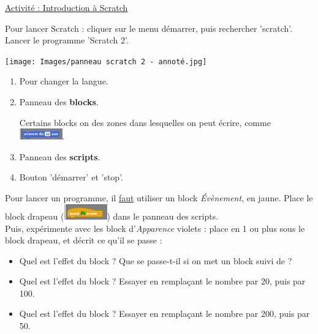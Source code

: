 \documentclass[a4paper,11pt]{article}
\newcommand{\exerciceSpacing}{2em}
\begin{document}
\begin{center}
	\LARGE
	\uline{Activité : Introduction à Scratch}
\end{center}

\begin{greybox}[frametitle={Pour commencer}]
	Pour lancer Scratch : cliquer sur le menu démarrer, puis rechercher 'scratch'. Lancer le programme 'Scratch 2'. \vspace{1em}

	\texttt{[image: Images/panneau scratch 2 - annoté.jpg]}

	\begin{enumerate}
		\item Pour changer la langue.
		\item Panneau des \textbf{blocks}.

		      Certains blocks on des zones dans lesquelles on peut écrire, comme \includegraphics[width=5em]{Images/Block avancer de 10 pas.png}.
		\item Panneau des \textbf{scripts}.
		\item Bouton 'démarrer' et 'stop'.
	\end{enumerate}
\end{greybox}

\vspace{\exerciceSpacing}

\begin{exercice}
	Pour lancer un programme, il \uline{faut} utiliser un block \textit{Évènement}, en jaune. Place le block drapeau (\includegraphics[width=5em]{Images/Block drapeau.png}) dans le panneau des scripts. \\

	Puis, expérimente avec les block d'\textit{Apparence} violets : place en 1 ou plus sous le block drapeau, et décrit ce qu'il se passe :
	\begin{itemize}
		\item Quel est l'effet du block  ? Que se passe-t-il si on met un block  suivi de  ? \vspace{0.5em}

		      \dotfill
		\item Quel est l'effet du block  ? Essayer en remplaçant le nombre par 20, puis par 100. \vspace{0.5em}

		      \dotfill
		\item Quel est l'effet du block  ? Essayer en remplaçant le nombre par 200, puis par 50. \vspace{0.5em}

		      \dotfill
	\end{itemize}
\end{exercice}
\end{document}
